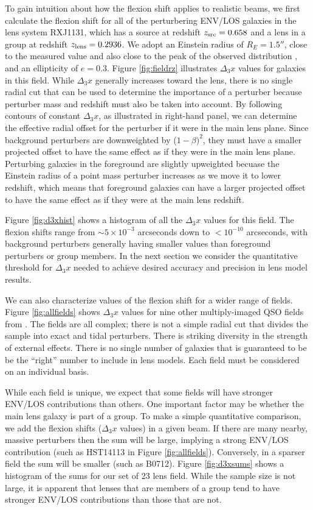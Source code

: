 \documentclass{emulateapj}
\begin{document}
To gain intuition about how the flexion shift applies to realistic beams, we first calculate the flexion shift for all of the perturbering ENV/LOS galaxies in the lens system RXJ1131, which has a source at redshift $z_{\rm{src}} = 0.658$ and a lens in a group at redshift $z_{\rm{lens}} = 0.2936$.  We adopt an Einstein radius of $R_E = 1.5''$, close to the measured value \citep{Suyu13} and also close to the peak of the observed distribution \citep{Sonnenfeld13}, and an ellipticity of $e=0.3$.  Figure \ref{fig:fieldrz} illustrates $\Delta_3 x$ values for galaxies in this field.  While $\Delta_3 x$ generally increases toward the lens, there is no single radial cut that can be used to determine the importance of a perturber because perturber mass and redshift must also be taken into account.  By following contours of constant $\Delta_3 x$, as illustrated in right-hand panel, we can determine the effective radial offset for the perturber if it were in the main lens plane. Since background perturbers are downweighted by ($1-\beta)^2$, they must have a smaller projected offset to have the same effect as if they were in the main lens plane. Perturbing galaxies in the foreground are slightly upweighted becuase the Einstein radius of a point mass perturber increases as we move it to lower redshift, which means that foreground galaxies can have a larger projected offset to have the same effect as if they were at the main lens redshift.

Figure \ref{fig:d3xhist} shows a histogram of all the $\Delta_3 x$ values for this field.  The flexion shifts range from $\sim 5 \times 10^{-3}$ arcseconds down to $<10^{-10}$ arcseconds, with background perturbers generally having smaller values than foreground perturbers or group members.  In the next section we consider the quantitative threshold for $\Delta_3 x$ needed to achieve desired accuracy and precision in lens model results.

We can also characterize values of the flexion shift for a wider range of fields.  Figure \ref{fig:allfields} shows $\Delta_3 x$ values for nine other multiply-imaged QSO fields from \citet{Wong11}.  The fields are all complex; there is not a simple radial cut that divides the sample into exact and tidal perturbers.  There is striking diversity in the strength of external effects.  There is no single number of galaxies that is guaranteed to be be the ``right'' number to include in lens models.  Each field must be considered on an individual basis.

While each field is unique, we expect that some fields will have stronger ENV/LOS contributions than others. One important factor may be whether the main lens galaxy is part of a group. To make a simple quantitative comparison, we add the flexion shifts ($\Delta_3 x$ values) in a given beam. If there are many nearby, massive perturbers then the sum will be large, implying a strong ENV/LOS contribution (such as HST14113 in Figure \ref{fig:allfields}). Conversely, in a sparser field the sum will be smaller (such as B0712). Figure \ref{fig:d3xsums} shows a histogram of the sums for our set of 23 lens field. While the sample size is not large, it is apparent that lenses that are members of a group tend to have stronger ENV/LOS contributions than those that are not.
\end{document}

